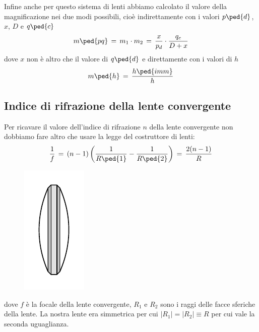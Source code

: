 Infine anche per questo sistema di lenti abbiamo calcolato il valore della magnificazione nei due modi possibili, cioè indirettamente con i valori $p\ped{d}$, $x$, $D$ e $q\ped{c}$
\begin{equation}
    m\ped{pq} \,=\, m_1 \cdot m_2 \,=\, \frac{x}{p_d} \cdot \frac{q_c}{D+x}
\end{equation} %
dove $x$ non è altro che il valore di $q\ped{d}$ e direttamente con i valori di $h$
\begin{equation}
    m\ped{h} \,=\, \frac{h\ped{imm}}{h}
\end{equation}



\subsection{Indice di rifrazione della lente convergente}

Per ricavare il valore dell'indice di rifrazione $n$ della lente convergente non dobbiamo fare altro che usare la legge del costruttore di lenti:
\begin{equation}
\frac{1}{f} \,=\, (n-1)\left(\frac{1}{R\ped{1}}-\frac{1}{R\ped{2}}\right) \,=\, \frac{2(n-1)}{R}
	\label{eq:costruttore}
\end{equation}
%
\begin{figure}
  \begin{center}
    \includegraphics{lente.pdf}
  \end{center}
\end{figure}
%
dove $f$ è la focale della lente convergente, $R_1$ e $R_2$ sono i raggi delle facce sferiche della lente. La nostra lente era simmetrica per cui $|R_1| = |R_2| \equiv R$ per cui vale la seconda uguaglianza.

